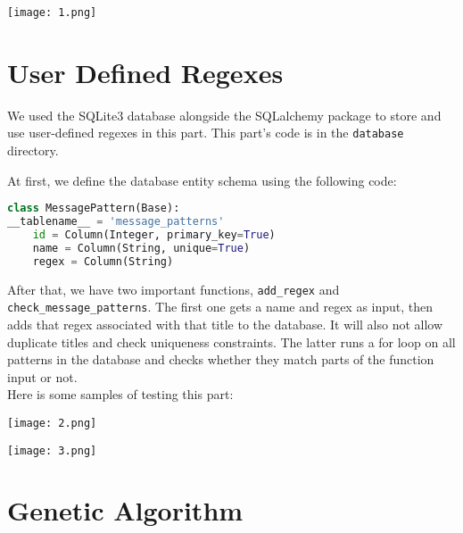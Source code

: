 \documentclass{solutionclass} %
\begin{document}
\begin{center}
  \texttt{[image: 1.png]}
\end{center}

\section{User Defined Regexes}
\begin{solution}
We used the SQLite3 database alongside the SQLalchemy package to store and use user-defined regexes in this part. This part's code is in the \verb*|database| directory.

At first, we define the database entity schema using the following code:
\end{solution}

\begin{lstlisting}[language=Python]
class MessagePattern(Base):
__tablename__ = 'message_patterns'
	id = Column(Integer, primary_key=True)
	name = Column(String, unique=True)
	regex = Column(String)
\end{lstlisting}

\begin{solution}
After that, we have two important functions, \verb*|add_regex| and \verb*|check_message_patterns|. The first one gets a name and regex as input, then adds that regex associated with that title to the database. It will also not allow duplicate titles and check uniqueness constraints. The latter runs a for loop on all patterns in the database and checks whether they match parts of the function input or not.\\

Here is some samples of testing this part:
\end{solution}

\begin{center}
  \texttt{[image: 2.png]}
\end{center}

\begin{center}
  \texttt{[image: 3.png]}
\end{center}

\section{Genetic Algorithm}
\end{document}
